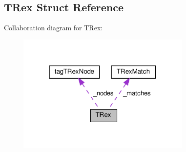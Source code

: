 \hypertarget{structTRex}{}\subsection{T\+Rex Struct Reference}
\label{structTRex}


Collaboration diagram for T\+Rex\+:\nopagebreak
\begin{figure}[H]
\begin{center}
\leavevmode
\includegraphics[width=244pt]{structTRex__coll__graph}
\end{center}
\end{figure}
